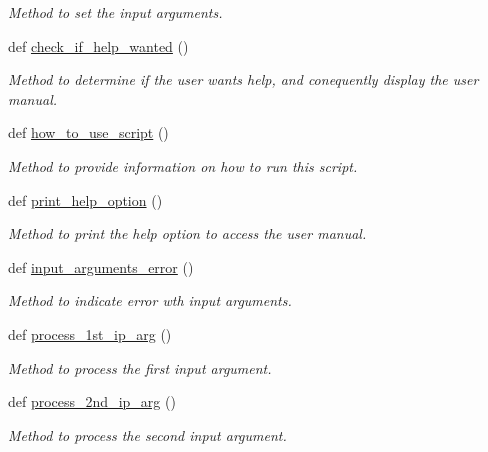 \begin{DoxyCompactItemize}
\begin{DoxyCompactList}\small\item\em Method to set the input arguments. \end{DoxyCompactList}\item 
def \hyperlink{classutilities_1_1queue__ip__arguments_1_1queue__ip__args_a1a87ae4035acfa51fe1d1aff53f770f3}{check\+\_\+if\+\_\+help\+\_\+wanted} ()
\begin{DoxyCompactList}\small\item\em Method to determine if the user wants help, and conequently display the user manual. \end{DoxyCompactList}\item 
def \hyperlink{classutilities_1_1queue__ip__arguments_1_1queue__ip__args_a5fecd33a91d20f19acba2fb1b8d1a60e}{how\+\_\+to\+\_\+use\+\_\+script} ()
\begin{DoxyCompactList}\small\item\em Method to provide information on how to run this script. \end{DoxyCompactList}\item 
def \hyperlink{classutilities_1_1queue__ip__arguments_1_1queue__ip__args_a28c79307da87e28e9ac3467290fd5738}{print\+\_\+help\+\_\+option} ()
\begin{DoxyCompactList}\small\item\em Method to print the help option to access the user manual. \end{DoxyCompactList}\item 
def \hyperlink{classutilities_1_1queue__ip__arguments_1_1queue__ip__args_afdfbfffba8afb5e786283dd22d856e93}{input\+\_\+arguments\+\_\+error} ()
\begin{DoxyCompactList}\small\item\em Method to indicate error wth input arguments. \end{DoxyCompactList}\item 
def \hyperlink{classutilities_1_1queue__ip__arguments_1_1queue__ip__args_ae1fc6d7af2e429d0656dbf388711db94}{process\+\_\+1st\+\_\+ip\+\_\+arg} ()
\begin{DoxyCompactList}\small\item\em Method to process the first input argument. \end{DoxyCompactList}\item 
def \hyperlink{classutilities_1_1queue__ip__arguments_1_1queue__ip__args_a82d245379c48196f61d4268882dd5c6d}{process\+\_\+2nd\+\_\+ip\+\_\+arg} ()
\begin{DoxyCompactList}\small\item\em Method to process the second input argument. \end{DoxyCompactList}\end{DoxyCompactItemize}
